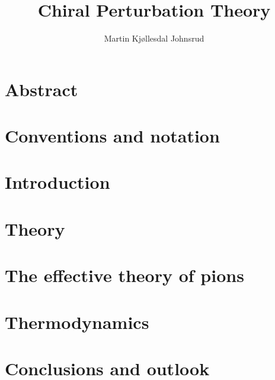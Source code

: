 \documentclass{book}
\title{Chiral Perturbation Theory}
\author{Martin Kjøllesdal Johnsrud}
\begin{document}
\maketitle 

\tableofcontents
\listoftodos

\chapter*{Abstract}


\chapter*{Conventions and notation}



\chapter{Introduction}



\chapter{Theory}
\label{chapter:theory}






\chapter{The effective theory of pions}
\label{chapter:effective theory of pions}








\chapter{Thermodynamics}
\label{chapter:thermodynamics}






\chapter{Conclusions and outlook}
\label{chpater:conclusion and outlook}
\end{document}
